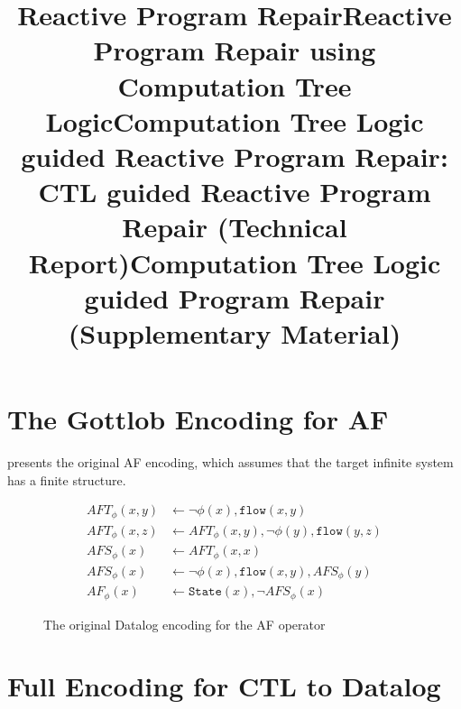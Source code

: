 \documentclass[acmsmall,screen,review,anonymous,nonacm]{acmart}
\title{Reactive Program Repair}
\title{Reactive Program Repair using Computation Tree Logic}
\title{Computation Tree Logic guided Reactive Program Repair}
\title{\toolName: CTL guided Reactive Program Repair {\Large (Technical Report)}}
\title{Computation Tree Logic guided Program Repair \\{\Large (Supplementary Material)}
}
\begin{document}
\maketitle




\section{The Gottlob Encoding for AF}
\label{appsec:AF_encoding}


 presents the original AF encoding, which assumes that the target infinite system has a finite structure.  


\begin{figure}[!h]
\vspace{-3mm}
\begin{align*}
AFT_{\phi}(x, y) &\leftarrow \neg \phi(x), \mathtt{flow}(x, y)  
\\ 
AFT_{\phi}(x, z) &\leftarrow AFT_{\phi}(x, y), \neg \phi(y), \mathtt{flow}(y, z)  \\
AFS_{\phi}(x) &\leftarrow AFT_{\phi}(x, x) 
\\ 
AFS_{\phi}(x) &\leftarrow \neg \phi(x), \mathtt{flow}(x, y) , AFS_{\phi}(y) \\ 
AF_{\phi}(x) &\leftarrow \mathtt{State}(x), \neg AFS_{\phi}(x)
\end{align*}
\vspace{-2mm}

\caption{The original Datalog encoding for the AF operator \cite{gottlob2002datalog}}
\label{fig:AF_encoding}
\end{figure}

\section{Full Encoding for CTL to Datalog}
\label{appsec:full_encoding}
\end{document}
